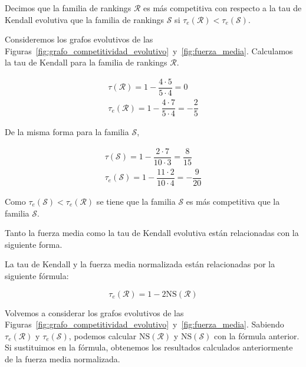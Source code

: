 \begin{defi}
Decimos que la familia de rankings $\mathcal{R}$ es más competitiva con respecto a la tau de Kendall evolutiva que la familia de rankings $\mathcal{S}$ si $\tau_e(\mathcal{R}) < \tau_e(\mathcal{S})$.
\end{defi}

\begin{ejemplo}
Consideremos los grafos evolutivos de las Figuras~\ref{fig:grafo_competitividad_evolutivo}~y~\ref{fig:fuerza_media}. Calculamos la tau de Kendall para la familia de rankings $\mathcal{R}$.

\begin{eqnarray}
\tau(\mathcal{R}) = 1 - \dfrac{4 \cdot 5}{5 \cdot 4} = 0\\
\tau_e(\mathcal{R}) = 1 - \dfrac{4 \cdot 7}{5 \cdot 4} = -\dfrac{2}{5}
\end{eqnarray}

De la misma forma para la familia $\mathcal{S}$,

\begin{eqnarray}
\tau(\mathcal{S}) = 1 - \dfrac{2 \cdot 7}{10 \cdot 3} = \dfrac{8}{15}\\
\tau_e(\mathcal{S}) = 1 - \dfrac{11 \cdot 2}{10 \cdot 4} = -\dfrac{9}{20}
\end{eqnarray}

Como $\tau_e(\mathcal{S}) < \tau_e(\mathcal{R})$ se tiene que la familia $\mathcal{S}$ es más competitiva que la familia $\mathcal{S}$.

\end{ejemplo}

Tanto la fuerza media como la tau de Kendall evolutiva están relacionadas con la siguiente forma.

\begin{prop}
La tau de Kendall y la fuerza media normalizada están relacionadas por la siguiente fórmula:

\begin{equation}
\tau_e(\mathcal{R}) = 1 - 2 \mathrm{NS}(\mathcal{R})
\end{equation}
\end{prop}

\begin{ejemplo}
Volvemos a considerar los grafos evolutivos de las Figuras~\ref{fig:grafo_competitividad_evolutivo}~y~\ref{fig:fuerza_media}. Sabiendo $\tau_e(\mathcal{R})$ y $\tau_e(\mathcal{S})$, podemos calcular $\mathrm{NS}(\mathcal{R})$ y $\mathrm{NS}(\mathcal{S})$ con la fórmula anterior. Si sustituimos en la fórmula, obtenemos los resultados calculados anteriormente de la fuerza media normalizada.
\end{ejemplo}

